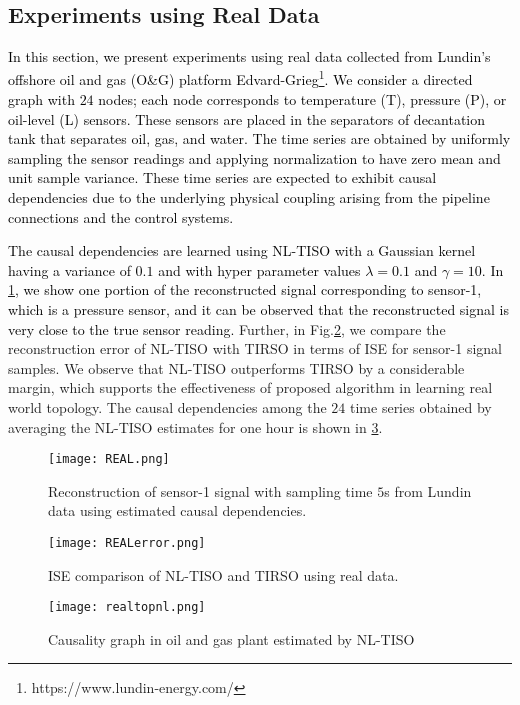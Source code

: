 \documentclass[conference]{IEEEtran}
\newcommand{\cB}[1]{\textcolor{black}{#1}}
\begin{document}
\subsection{Experiments using Real Data}
\label{real}
\cB{In this section, we present experiments using real data collected from Lundin’s offshore oil and gas (O\&G) platform Edvard-Grieg\footnote{https://www.lundin-energy.com/}. We consider a directed graph with $24$ nodes; each node corresponds to  temperature (T), pressure (P), or oil-level (L) sensors. These sensors are placed in the separators of  decantation tank that separates oil, gas, and water. The time series are obtained by  uniformly sampling the sensor readings and applying normalization to have zero mean and unit sample variance. These time series are expected to exhibit causal dependencies due to the underlying physical coupling arising from the pipeline connections and the control systems.}

\cB{The causal dependencies are learned using NL-TISO with a Gaussian kernel having a variance of $0.1$ and with hyper parameter values $\lambda=0.1$ and $\gamma=10$. In \cref{realpred}, we show one portion of the reconstructed signal corresponding to  sensor-1, which is a pressure sensor, and it can be observed that the reconstructed signal is very close to the true sensor reading.} Further, in Fig.\ref{realerror}, we compare the reconstruction error of NL-TISO with TIRSO in terms of ISE for sensor-1 signal samples. We observe that NL-TISO outperforms TIRSO by a considerable margin, which supports the effectiveness of proposed algorithm in learning real world topology. The causal dependencies among the $24$ time series obtained by averaging the NL-TISO estimates for one hour is shown in \cref{realtop}. 
\begin{figure}[hbt!]
\centerline{\texttt{[image: REAL.png]}}
\caption{Reconstruction of sensor-1 signal with sampling time $5$s from Lundin data  using estimated causal dependencies.}
\label{realpred}
\end{figure}

\begin{figure}[hbt!]
\centerline{\texttt{[image: REALerror.png]}}
\caption{ISE comparison of NL-TISO and TIRSO using real data.}
\label{realerror}
\end{figure}
\begin{figure}[hbt!]
\centerline{\texttt{[image: realtopnl.png]}}
\caption{Causality graph in oil and gas plant estimated by NL-TISO}
\label{realtop}
\end{figure}
\end{document}
